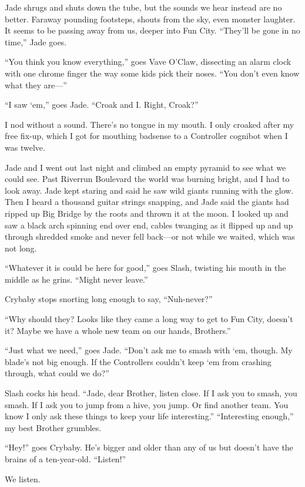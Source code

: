 Jade shrugs and shuts down the tube, but the sounds we hear instead are no better. Faraway pounding footsteps, shouts from the sky, even monster laughter. It seems to be passing away from us, deeper into Fun City.
``They'll be gone in no time,'' Jade goes.

``You think you know everything,'' goes Vave O'Claw, dissecting an alarm clock with one chrome finger the way some kids pick their noses. ``You don't even know what they are—''

``I saw ‘em,'' goes Jade. ``Croak and I. Right, Croak?''

I nod without a sound. There's no tongue in my mouth. I only croaked after my free fix-up, which I got for mouthing badsense to a Controller cognibot when I was twelve.

Jade and I went out last night and climbed an empty pyramid to see what we could see. Past Riverrun Boulevard the world was burning bright, and I had to look away. Jade kept staring and said he saw wild giants running with the glow. Then I heard a thousand guitar strings snapping, and Jade said the giants had ripped up Big Bridge by the roots and thrown it at the moon. I looked up and saw a black arch spinning end over end, cables twanging as it flipped up and up through shredded smoke and never fell back—or not while we waited, which was not long.

``Whatever it is could be here for good,'' goes Slash, twisting his mouth in the middle as he grins. ``Might never leave.''

Crybaby stops snorting long enough to say, ``Nuh-never?''

``Why should they? Looks like they came a long way to get to Fun City, doesn't it? Maybe we have a whole new team on our hands, Brothers.''

``Just what we need,'' goes Jade. ``Don't ask me to smash with ‘em, though. My blade's not big enough. If the Controllers couldn't keep ‘em from crashing through, what could we do?''

Slash cocks his head. ``Jade, dear Brother, listen close. If I ask you to smash, you smash. If I ask you to jump from a hive, you jump. Or find another team. You know I only ask these things to keep your life interesting.''
``Interesting enough,'' my best Brother grumbles.

``Hey!'' goes Crybaby. He's bigger and older than any of us but doesn't have the brains of a ten-year-old. ``Listen!''

We listen.


